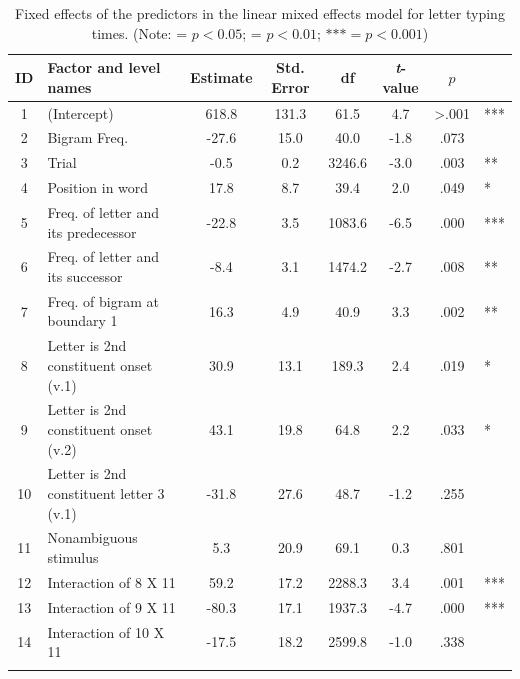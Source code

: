\documentclass[output=paper]{langsci/langscibook}
\begin{document}
\begin{table}
\caption{Fixed effects of the predictors in the linear mixed effects model for letter typing times. (Note: \text{*} = $p < 0.05$; \text{**} = $p < 0.01$; $\text{***} = p < 0.001$)\label{tab:libben:5}}
\begin{tabular}{clSSSSS[table-format=<1.3]l}
\lsptoprule
 ID & Factor and level names &  {Estimate} &  {Std. Error} &  {df} &  {\textit{t}-value} &  {$p$} & \\ & (Intercept) &  618.8 &  131.3 &  61.5 &  4.7 &  >.001 & ***\\
 2 & Bigram Freq. &  -27.6 &  15.0 &  40.0 &  -1.8 &  .073 & \\
 3 & Trial &  -0.5 &  0.2 &  3246.6 &  -3.0 &  .003 & **\\
 4 & Position in word &  17.8 &  8.7 &  39.4 &  2.0 &  .049 & *\\
 5 & Freq. of letter and its predecessor &  -22.8 &  3.5 &  1083.6 &  -6.5 &  .000 & ***\\
 6 & Freq. of letter and its successor &  -8.4 &  3.1 &  1474.2 &  -2.7 &  .008 & **\\
 7 & Freq. of bigram at boundary 1 &  16.3 &  4.9 &  40.9 &  3.3 &  .002 & **\\
 8 & Letter is 2nd constituent onset (v.1) &  30.9 &  13.1 &  189.3 &  2.4 &  .019 & *\\
 9 & Letter is 2nd constituent onset (v.2) &  43.1 &  19.8 &  64.8 &  2.2 &  .033 & *\\
 10 & Letter is 2nd constituent letter 3 (v.1) &  -31.8 &  27.6 &  48.7 &  -1.2 &  .255 & \\
 11 & Nonambiguous stimulus &  5.3 &  20.9 &  69.1 &  0.3 &  .801 & \\
 12 & Interaction of 8 X 11 &  59.2 &  17.2 &  2288.3 &  3.4 &  .001 & ***\\
 13 & Interaction of 9 X  11 &  -80.3 &  17.1 &  1937.3 &  -4.7 &  .000 & ***\\
 14 & Interaction of 10 X  11 &  -17.5 &  18.2 &  2599.8 &  -1.0 &  .338 & \\
\lspbottomrule
\end{tabular}
\end{table}
  
\end{document}
